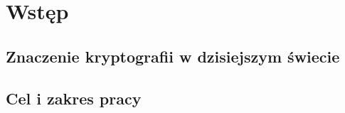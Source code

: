 \chapter*{Wstęp}

\section*{Znaczenie kryptografii w dzisiejszym świecie}

\section*{Cel i zakres pracy}

